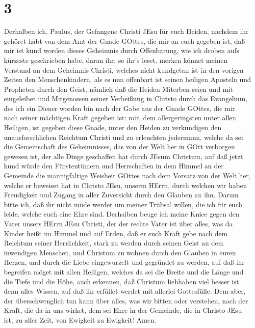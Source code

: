 \hypertarget{section-2}{%
\section{3}\label{section-2}}

 Derhalben ich, Paulus, der Gefangene Christi JEsu für euch
Heiden,  nachdem ihr gehöret habt von dem Amt der Gnade
GOttes, die mir an euch gegeben ist,  daß mir ist kund
worden dieses Geheimnis durch Offenbarung, wie ich droben aufs kürzeste
geschrieben habe,  daran ihr, so ihr's leset, merken könnet
meinen Verstand an dem Geheimnis Christi,  welches nicht
kundgetan ist in den vorigen Zeiten den Menschenkindern, als es nun
offenbart ist seinen heiligen Aposteln und Propheten durch den Geist,
 nämlich daß die Heiden Miterben seien und mit eingeleibet
und Mitgenossen seiner Verheißung in Christo durch das Evangelium,
 des ich ein Diener worden bin nach der Gabe aus der Gnade
GOttes, die mir nach seiner mächtigen Kraft gegeben ist: 
mir, dem allergeringsten unter allen Heiligen, ist gegeben diese Gnade,
unter den Heiden zu verkündigen den unausforschlichen Reichtum Christi
 und zu erleuchten jedermann, welche da sei die Gemeinschaft
des Geheimnisses, das von der Welt her in GOtt verborgen gewesen ist,
der alle Dinge geschaffen hat durch JEsum Christum,  auf
daß jetzt kund würde den Fürstentümern und Herrschaften in dem Himmel an
der Gemeinde die mannigfaltige Weisheit GOttes  nach dem
Vorsatz von der Welt her, welche er beweiset hat in Christo JEsu, unserm
HErrn,  durch welchen wir haben Freudigkeit und Zugang in
aller Zuversicht durch den Glauben an ihn.  Darum bitte
ich, daß ihr nicht müde werdet um meiner Trübsal willen, die ich für
euch leide, welche euch eine Ehre sind.  Derhalben beuge
ich meine Kniee gegen den Vater unsers HErrn JEsu Christi, 
der der rechte Vater ist über alles, was da Kinder heißt im Himmel und
auf Erden,  daß er euch Kraft gebe nach dem Reichtum seiner
Herrlichkeit, stark zu werden durch seinen Geist an dem inwendigen
Menschen,  und Christum zu wohnen durch den Glauben in
euren Herzen, und durch die Liebe eingewurzelt und gegründet zu werden,
 auf daß ihr begreifen möget mit allen Heiligen, welches da
sei die Breite und die Länge und die Tiefe und die Höhe, 
auch erkennen, daß Christum liebhaben viel besser ist denn alles Wissen,
auf daß ihr erfüllet werdet mit allerlei Gottesfülle.  Dem
aber, der überschwenglich tun kann über alles, was wir bitten oder
verstehen, nach der Kraft, die da in uns wirket,  dem sei
Ehre in der Gemeinde, die in Christo JEsu ist, zu aller Zeit, von
Ewigkeit zu Ewigkeit! Amen.

